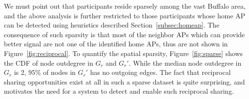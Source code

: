 We must point out that \PhoneLab{} participants reside sparsely among the vast
Buffalo area, and the above analysis is further restricted to those participants
whose home AP can be detected using heuristics described
Section~\ref{subsec:homeap}. The consequence of such sparsity is that most of
the neighbor APs which can provide better signal are not one of the identified
home APs, thus are not shown in Figure~\ref{fig:reciprocal}. To quantify the
spatial sparsity, Figure~\ref{fig:sparse} shows the CDF of node outdegree
in $G_r$ and $G_r'$. While the median node outdegree in $G_r$ is 2, 95\% of nodes
in $G_r'$ has no outgoing edges.  The fact that reciprocal sharing
opportunities exist at all in such a sparse dataset is quite surprising, and
motivates the need for a system to detect and enable such reciprocal \wifi{}
sharing.



